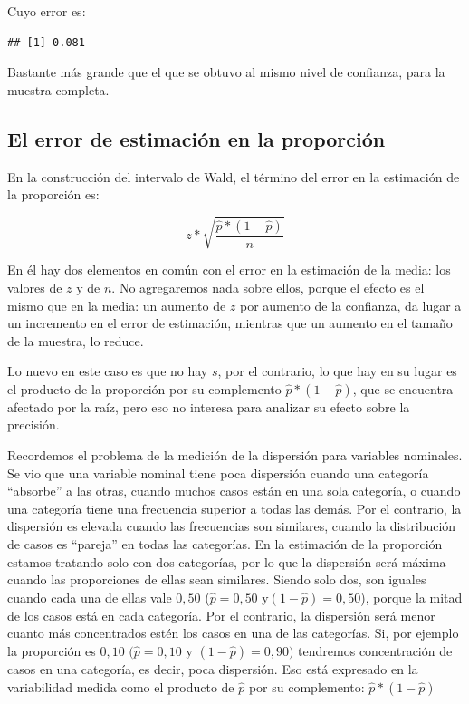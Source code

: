 \documentclass[]{book}
\begin{document}
Cuyo error es:

\begin{verbatim}
## [1] 0.081
\end{verbatim}

Bastante más grande que el que se obtuvo al mismo nivel de confianza, para la muestra completa.

\hypertarget{el-error-de-estimaciuxf3n-en-la-proporciuxf3n}{%
\subsection{El error de estimación en la proporción}\label{el-error-de-estimaciuxf3n-en-la-proporciuxf3n}}

En la construcción del intervalo de Wald, el término del error en la
estimación de la proporción es:

\[z*\sqrt{\frac{\widehat{p}*\left( 1 - \widehat{p} \right)}{n}}\]

En él hay dos elementos en común con el error en la estimación de la
media: los valores de \(z\) y de \(n\). No agregaremos nada sobre ellos,
porque el efecto es el mismo que en la media: un aumento de \(z\) por
aumento de la confianza, da lugar a un incremento en el error de
estimación, mientras que un aumento en el tamaño de la muestra, lo
reduce.

Lo nuevo en este caso es que no hay \(s\), por el contrario, lo que hay en su lugar es el producto de la proporción por su complemento
\(\widehat{p}*\left( 1 - \widehat{p} \right)\), que se encuentra afectado
por la raíz, pero eso no interesa para analizar su efecto sobre la
precisión.

Recordemos el problema de la medición de la dispersión para variables
nominales. Se vio que una variable nominal tiene poca dispersión cuando
una categoría ``absorbe'' a las otras, cuando muchos casos están en una
sola categoría, o cuando una categoría tiene una frecuencia superior a
todas las demás. Por el contrario, la dispersión es elevada cuando las
frecuencias son similares, cuando la distribución de casos es ``pareja''
en todas las categorías. En la estimación de la proporción estamos
tratando solo con dos categorías, por lo que la dispersión será máxima
cuando las proporciones de ellas sean similares. Siendo solo dos, son
iguales cuando cada una de ellas vale \(0,50\)
(\(\widehat{p} = 0,50\) y\(( 1 - \widehat{p}) = 0,50\)), porque
la mitad de los casos está en cada categoría. Por el contrario, la
dispersión será menor cuanto más concentrados estén los casos en una de
las categorías. Si, por ejemplo la proporción es
\(0,10\) \((\widehat{p} = 0,10\) y \(( 1 - \widehat{p}) = 0,90)\)
tendremos concentración de casos en una categoría, es decir, poca
dispersión. Eso está expresado en la variabilidad medida como el
producto de \(\widehat{p}\) por su complemento:
\(\widehat{p}*(1 - \widehat{p})\)
\end{document}
